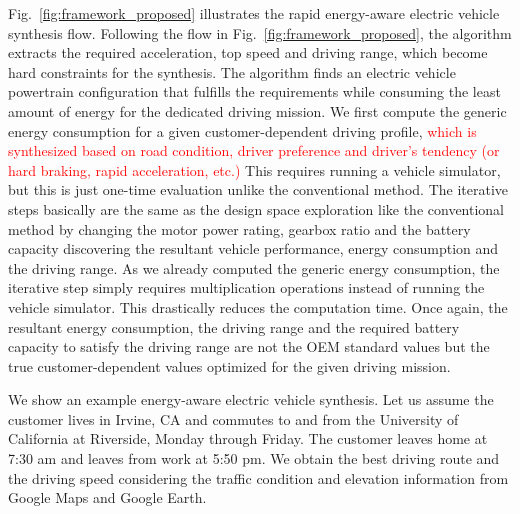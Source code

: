 \documentclass[journal]{IEEEtran}
\begin{document}
Fig.~\ref{fig:framework_proposed} illustrates the rapid energy-aware electric vehicle synthesis flow. 
Following the flow in Fig.~\ref{fig:framework_proposed}, the algorithm extracts the required acceleration, top speed and driving range, which become hard constraints for the synthesis. The algorithm finds an electric vehicle powertrain configuration that fulfills the requirements while consuming the least amount of energy for the dedicated driving mission. 
We first compute the generic energy consumption for a given customer-dependent driving profile, \textcolor{red}{which is synthesized based on road condition, driver preference and driver's tendency (or hard braking, rapid acceleration, etc.)} This requires running a vehicle simulator, but this is just one-time evaluation unlike the conventional method. The iterative steps basically are the same as the design space exploration like the conventional method by changing the motor power rating, gearbox ratio and the battery capacity discovering the resultant vehicle performance, energy consumption and the driving range. As we already computed the generic energy consumption, the iterative step simply requires multiplication operations instead of running the vehicle simulator. This drastically reduces the computation time. Once again, the resultant energy consumption, the driving range and the required battery capacity to satisfy the driving range are not the OEM standard values but the true customer-dependent values optimized for the given driving mission. 

We show an example energy-aware electric vehicle synthesis. Let us assume the customer lives in Irvine, CA and commutes to and from the University of California at Riverside, Monday through Friday. The customer leaves home at 7:30 am and leaves from work at 5:50 pm. We obtain the best driving route and the driving speed considering the traffic condition and elevation information from Google Maps and Google Earth.
\end{document}
